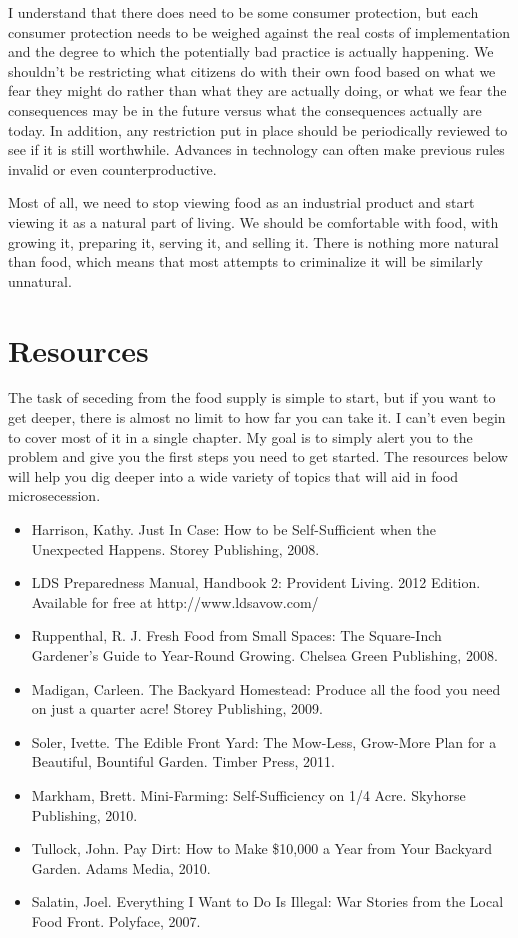 I understand that there does need to be some consumer protection, but
each consumer protection needs to be weighed against the real costs of
implementation and the degree to which the potentially bad practice is
actually happening. We shouldn’t be restricting what citizens do with
their own food based on what we fear they might do rather than what
they are actually doing, or what we fear the consequences may be in the
future versus what the consequences actually are today. In addition,
any restriction put in place should be periodically reviewed to see if
it is still worthwhile. Advances in technology can often make previous
rules invalid or even counterproductive.

Most of all, we need to stop viewing food as an industrial product and
start viewing it as a natural part of living. We should be comfortable
with food, with growing it, preparing it, serving it, and selling it.
There is nothing more natural than food, which means that most attempts
to criminalize it will be similarly unnatural.

\section{Resources}

The task of seceding from the food supply is simple to start, but if you
want to get deeper, there is almost no limit to how far you can take
it. I can’t even begin to cover most of it in a single chapter. My goal
is to simply alert you to the problem and give you the first steps
you need to get
started. The resources below will help you
dig deeper into a
wide variety of topics that will aid in food microsecession.

\begin{itemize}
\item 
Harrison, Kathy. Just In Case: How to be Self-Sufficient when the
Unexpected Happens. Storey Publishing, 2008. 
\item 
LDS Preparedness Manual, Handbook 2: Provident Living. 2012 Edition.
Available for free at http://www.ldsavow.com/
\item 
Ruppenthal, R. J. Fresh Food from Small Spaces: The Square-Inch
Gardener’s Guide to Year-Round Growing. Chelsea Green Publishing,
2008.
\item 
Madigan, Carleen. The Backyard Homestead: Produce all the food you need
on just a quarter acre!  Storey Publishing, 2009.
\item 
Soler, Ivette. The Edible Front Yard:  The Mow-Less, Grow-More Plan for
a Beautiful, Bountiful Garden. Timber Press, 2011.
\item 
Markham, Brett. Mini-Farming: Self-Sufficiency on 1/4 Acre. Skyhorse
Publishing, 2010.
\item 
Tullock, John. Pay Dirt: How to Make \$10,000 a Year from Your Backyard
Garden. Adams Media, 2010.
\item 
Salatin, Joel. Everything I Want to Do Is Illegal: War Stories from the
Local Food Front. Polyface, 2007.
\end{itemize}
